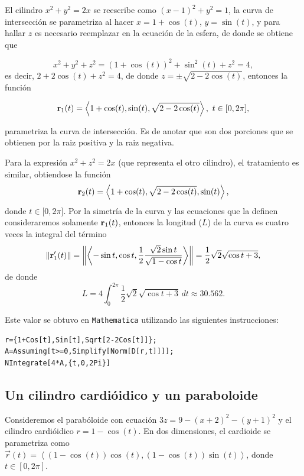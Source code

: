 El cilindro $x^{2}+y^{2}=2x$ se reescribe como $\left( x-1\right)^{2}+y^{2}=1$,
la curva de intersección se parametriza al hacer $x=1+\cos (t)$, $y=\sin (t)$, y para hallar $z$
es necesario reemplazar en la ecuación de la esfera, de donde se obtiene que

\[x^{2}+y^{2}+z^{2}= \left( 1+\cos (t) \right)
^{2}+\sin ^{2}(t) +z^{2}= 4,\]
es decir, $2+2\cos(t) +z^{2}=4$,
de donde $z=\pm \sqrt{2-2\cos (t)}$,
entonces la función

$${\bf r}_1(t) =\left\langle 1+\cos (t) ,\sin (t),\sqrt{2-2\cos (t) }\right\rangle ,\,\, t\in \lbrack 0,2\pi ],$$

parametriza la curva de intersección. Es de anotar que son dos porciones que se obtienen por la raiz positiva y la raiz negativa.

Para la expresión  $x^{2}+z^{2}=2x$ (que representa el otro cilindro), el tratamiento es similar, obtiendose la función
$${\bf r}_2(t) =\left\langle 1+\cos (t),\sqrt{2-2\cos (t)},\sin (t)\right\rangle ,$$
donde $t\in \lbrack 0,2\pi ]$.
Por la simetría de la curva y las ecuaciones que la definen
consideraremos solamente ${\bf r}_1(t)$, entonces la longitud ($L$) de la curva es cuatro veces la integral del
término
$$\left\Vert {\bf r}_1^{\prime }(t) \right\Vert =\left\Vert \left\langle -\sin t,\cos t,\frac{1}{2}\frac{\sqrt{2}\sin t}{\sqrt{1-\cos t}}\right\rangle \right\Vert=\frac{1}{2}\sqrt{2}\sqrt{\cos t+3} ,$$
de donde
$$L=4\int_{0}^{2\pi }\frac{1}{2}\sqrt{2}\sqrt{\cos t+3}\,dt \approx 30.562.$$

Este valor se obtuvo en \verb"Mathematica" utilizando las siguientes instrucciones:

\begin{tcolorbox}[title=\bf Instrucción \verb"Mathematica"]\begin{Verbatim}[formatcom=\letraverbatim]
r={1+Cos[t],Sin[t],Sqrt[2-2Cos[t]]};
A=Assuming[t>=0,Simplify[Norm[D[r,t]]]];
NIntegrate[4*A,{t,0,2Pi}]
\end{Verbatim}
\end{tcolorbox}

\subsection{Un cilindro cardióidico y un paraboloide} \label{cilcardiopar}

Consideremos el parabóloide con ecuación $3z=9-(x+2)^{2}-(y+1)^{2}$ y el cilindro cardióidico
$r=1-\cos (t)$. En dos dimensiones, el cardioide se  parametriza como
$\overrightarrow{r}(t)=\left\langle (1-\cos (t))\cos (t),(1-\cos (t))\sin(t)\right\rangle$,
donde $t\in [0,2\pi]$.

